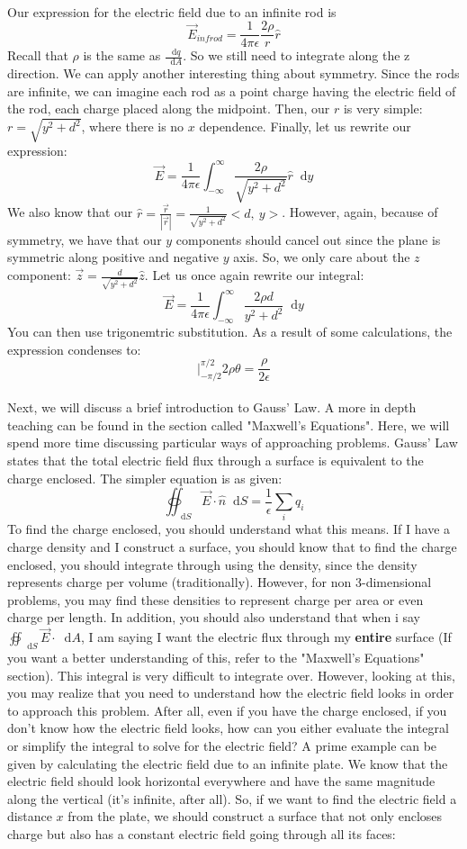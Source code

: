 \documentclass{article}
\newcommand*\dif{\mathop{}\!\mathrm{d}}
\begin{document}
\\
Our expression for the electric field due to an infinite rod is $$\vec{E}_{inf rod} = \frac{1}{4\pi\epsilon}\frac{2\rho}{r}\hat{r}$$Recall that $\rho$ is the same as $\frac{\dif q}{\dif A}$. So we still need to integrate along the z direction. We can apply another interesting thing about symmetry. Since the rods are infinite, we can imagine each rod as a point charge having the electric field of the rod, each charge placed along the midpoint. Then, our $r$ is very simple: $r = \sqrt{y^2 + d^2}$, where there is no $x$ dependence. Finally, let us rewrite our expression: $$\vec{E} = \frac{1}{4\pi\epsilon}\int_{-\infty}^{\infty} \frac{2\rho}{\sqrt{y^2 + d^2}}\hat{r} \dif y$$We also know that our $\hat{r} = \frac{\vec{r}}{|\vec{r}|} = \frac{1}{\sqrt{y^2 + d^2}}<d,\ y>$. However, again, because of symmetry, we have that our $y$ components should cancel out since the plane is symmetric along positive and negative $y$ axis. So, we only care about the $z$ component: $\vec{z} = \frac{d}{\sqrt{y^2 + d^2}}\hat{z}$. Let us once again rewrite our integral: $$\vec{E} = \frac{1}{4\pi\epsilon}\int_{-\infty}^{\infty} \frac{2\rho d}{y^2 + d^2} \dif y$$You can then use trigonemtric substitution. As a result of some calculations, the expression condenses to: $$\big|_{-\pi/2}^{\pi/2} 2\rho \theta = \frac{\rho}{2\epsilon}$$
\\
Next, we will discuss a brief introduction to Gauss' Law. A more in depth teaching can be found in the section called "Maxwell's Equations". Here, we will spend more time discussing particular ways of approaching problems. Gauss' Law states that the total electric field flux through a surface is equivalent to the charge enclosed. The simpler equation is as given: $$\oiint_{\dif S} \vec{E} \cdot \hat{n} \dif S= \frac{1}{\epsilon}\sum\limits_i q_i$$To find the charge enclosed, you should understand what this means. If I have a charge density and I construct a surface, you should know that to find the charge enclosed, you should integrate through using the density, since the density represents charge per volume (traditionally). However, for non 3-dimensional problems, you may find these densities to represent charge per area or even charge per length. In addition, you should also understand that when i say $\oiint_{\dif S} \vec{E} \cdot \dif A$, I am saying I want the electric flux through my \textbf{entire} surface (If you want a better understanding of this, refer to the "Maxwell's Equations" section). This integral is very difficult to integrate over. However, looking at this, you may realize that you need to understand how the electric field looks in order to approach this problem. After all, even if you have the charge enclosed, if you don't know how the electric field looks, how can you either evaluate the integral or simplify the integral to solve for the electric field? A prime example can be given by calculating the electric field due to an infinite plate. We know that the electric field should look horizontal everywhere and have the same magnitude along the vertical (it's infinite, after all). So, if we want to find the electric field a distance $x$ from the plate, we should construct a surface that not only encloses charge but also has a constant electric field going through all its faces:
\end{document}
